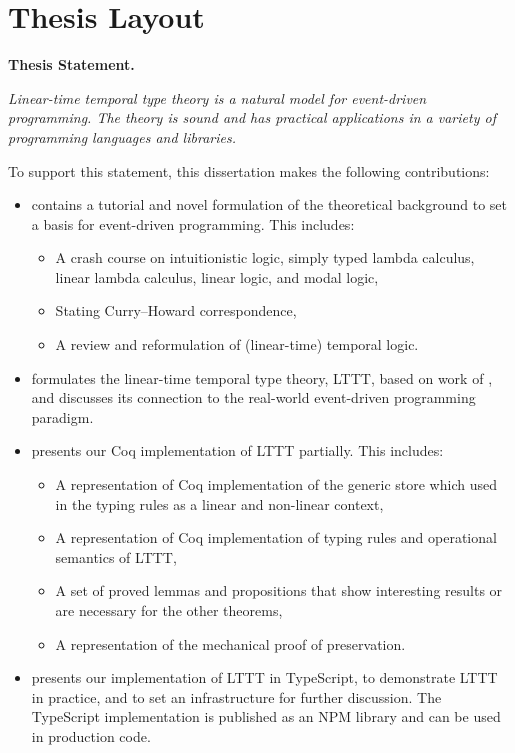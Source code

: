 \section{Thesis Layout}

\textbf{Thesis Statement.}

\textit{Linear-time temporal type theory is a natural model for event-driven programming. The theory is sound and has practical applications in a variety of programming languages and libraries.}

To support this statement, this dissertation makes the following contributions:

\begin{itemize}
    \item {} contains a tutorial and novel formulation of the theoretical background to set a basis for event-driven programming. This includes:
    \begin{itemize}
        \item A crash course on intuitionistic logic, simply typed lambda calculus, linear lambda calculus, linear logic, and modal logic,
        \item Stating Curry--Howard correspondence,
        \item A review and reformulation of (linear-time) temporal logic.
    \end{itemize}
    \item {} formulates the linear-time temporal type theory, LTTT, based on work of \cite{Paykin2016TheEO}, and discusses its connection to the real-world event-driven programming paradigm.
    \item {} presents our Coq implementation of LTTT partially. This includes:
    \begin{itemize}
        \item A representation of Coq implementation of the generic store which used in the typing rules as a linear and non-linear context,
        \item A representation of Coq implementation of typing rules and operational semantics of LTTT,
        \item A set of proved lemmas and propositions that show interesting results or are necessary for the other theorems,
        \item A representation of the mechanical proof of preservation.
    \end{itemize}
    \item {} presents our implementation of LTTT in TypeScript, to demonstrate LTTT in practice, and to set an infrastructure for further discussion. The TypeScript implementation is published as an NPM library and can be used in production code.
\end{itemize}